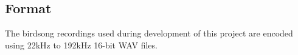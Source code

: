 \subsection{Format}
The birdsong recordings used during development of this project are encoded
using 22kHz to 192kHz 16-bit WAV files.
